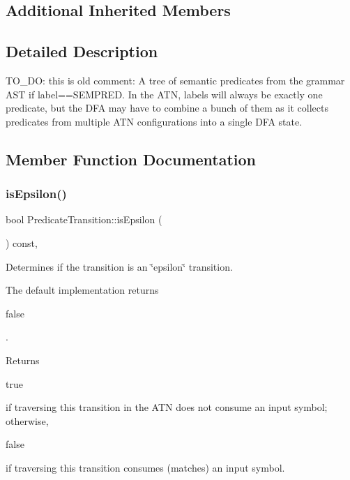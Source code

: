 \subsection*{Additional Inherited Members}


\subsection{Detailed Description}
T\+O\+\_\+\+DO\+: this is old comment\+: A tree of semantic predicates from the grammar A\+ST if label==S\+E\+M\+P\+R\+ED. In the A\+TN, labels will always be exactly one predicate, but the D\+FA may have to combine a bunch of them as it collects predicates from multiple A\+TN configurations into a single D\+FA state. 

\subsection{Member Function Documentation}
\mbox{\label{classantlr4_1_1atn_1_1PredicateTransition_a1c43f41d9500f136375cff1d4b7a5d7a}} 
\subsubsection{\texorpdfstring{is\+Epsilon()}{isEpsilon()}}
{\footnotesize\ttfamily bool Predicate\+Transition\+::is\+Epsilon (\begin{DoxyParamCaption}{ }\end{DoxyParamCaption}) const\hspace{0.3cm}{\ttfamily [override]}, {\ttfamily [virtual]}}

Determines if the transition is an \char`\"{}epsilon\char`\"{} transition.

The default implementation returns
\begin{DoxyCode}
\textcolor{keyword}{false} 
\end{DoxyCode}
 .

\begin{DoxyReturn}{Returns}

\begin{DoxyCode}
\textcolor{keyword}{true} 
\end{DoxyCode}
 if traversing this transition in the A\+TN does not consume an input symbol; otherwise,
\begin{DoxyCode}
\textcolor{keyword}{false} 
\end{DoxyCode}
 if traversing this transition consumes (matches) an input symbol. 
\end{DoxyReturn}


